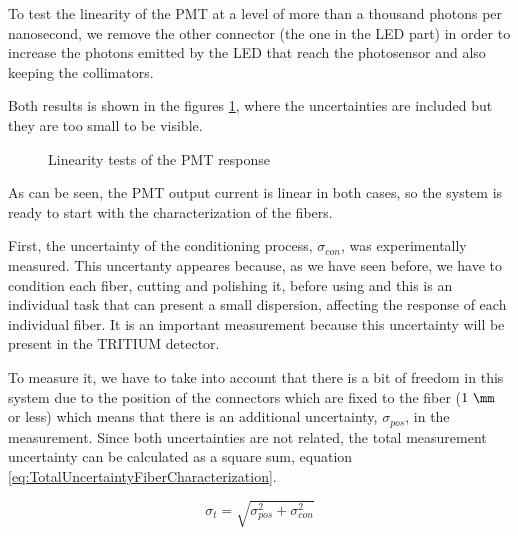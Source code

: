 To test the linearity of the PMT at a level of more than a thousand photons per nanosecond, we remove the other connector (the one in the LED part) in order to increase the photons emitted by the LED that reach the photosensor and also keeping the collimators.

Both results is shown in the figures \ref{fig:LinearityRangesOfPMT}, where the uncertainties are included but they are too small to be visible.

\begin{figure}[h]
 \centering
    \newline
 \caption{Linearity tests of the PMT response}
 \label{fig:LinearityRangesOfPMT}
\end{figure}

As can be seen, the PMT output current is linear in both cases, so the system is ready to start with the characterization of the fibers.

First, the uncertainty of the conditioning process, $\sigma_{con}$, was experimentally measured. This uncertanty appeares because, as we have seen before, we have to condition each fiber, cutting and polishing it, before using and this is an individual task that can present a small dispersion, affecting the response of each individual fiber. It is an important measurement because this uncertainty will be present in the TRITIUM detector.

To measure it, we have to take into account that there is a bit of freedom in this system due to the position of the connectors which are fixed to the fiber ($1~\mm$ or less) which means that there is an additional uncertainty, $\sigma_{pos}$, in the measurement. Since both uncertainties are not related, the total measurement uncertainty can be calculated as a square sum, equation \ref{eq:TotalUncertaintyFiberCharacterization}.

\begin{equation}
\sigma_{t} = \sqrt{\sigma^2_{pos} + \sigma^2_{con} }
\label{eq:TotalUncertaintyFiberCharacterization}
\end{equation}

